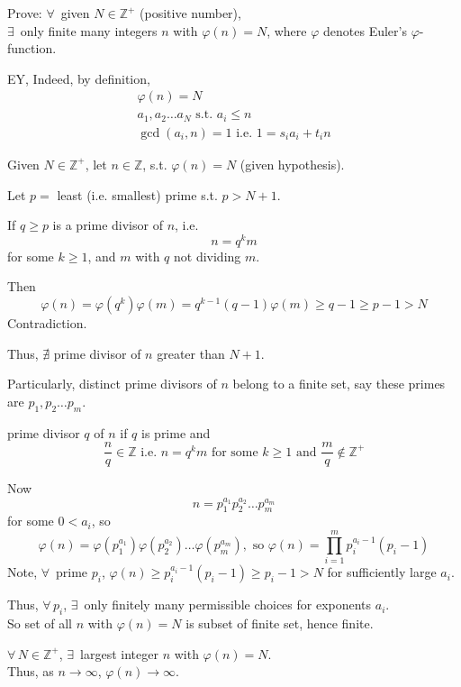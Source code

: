 Prove: $\forall \, $ given $N \in \mathbb{Z}^+$ (positive number), \\
$\exists \, $ only finite many integers $n$ with $\varphi(n) = N$, where $\varphi$ denotes Euler's $\varphi$-function.  

EY, Indeed, by definition, \\
\[
\begin{gathered}
\varphi(n) = N \\
a_1, a_2 \dots a_N \text{ s.t. } a_i \leq n \\
\gcd(a_i,n)=1 \text{ i.e. } 1 = s_i a_i + t_i n 
\end{gathered}
\]


Given $N \in \mathbb{Z}^+$, let $n \in \mathbb{Z}$, s.t. $\varphi(n) = N$ (given hypothesis).  

Let $p= $ least (i.e. smallest) prime s.t. $p > N+1$.  

If $q\geq p$ is a prime divisor of $n$, i.e. 
\[
n = q^k m 
\]
for some $k\geq 1$, and $m$ with $q$ not dividing $m$.  

Then 
\[
\varphi(n) = \varphi(q^k) \varphi(m) = q^{k-1}(q-1) \varphi(m) \geq q-1 \geq p -1 > N
\]
Contradiction.  

Thus, $\nexists$ prime divisor of $n$ greater than $N+1$.  

Particularly, distinct prime divisors of $n$ belong to a finite set, say these primes are $p_1,p_2 \dots p_m$.  

\begin{definition}
	prime divisor $q$ of $n$ if $q$ is prime and 
	\begin{equation}
	 \frac{n}{q} \in \mathbb{Z} \text{ i.e. } n =q^k m \text{ for some } k \geq 1 \text{ and } \frac{m}{q} \notin \mathbb{Z}^+
	\end{equation}
\end{definition}

Now
\[
n=p_1^{a_1}p_2^{a_2} \dots p_m^{a_m} 
\]
for some $0<a_i$, so 
\[
\varphi(n) = \varphi(p_1^{a_1}) \varphi(p_2^{a_2}) \dots \varphi( p_m^{a_m}), \text{ so } \varphi(n) = \prod_{i=1}^m p_i^{ a_i -1} (p_i-1)
\]
Note, $\forall \, $ prime $p_i$, $\varphi(n) \geq p_i^{a_i -1}(p_i-1) \geq p_i - 1 > N$ for sufficiently large $a_i$.  

Thus, $\forall \, p_i$, $\exists \, $ only finitely many permissible choices for exponents $a_i$.  \\
So set of all $n$ with $\varphi(n) = N$ is subset of finite set, hence finite.  

$\forall \, N \in \mathbb{Z}^+$, $\exists \, $ largest integer $n$ with $\varphi(n) = N$.  \\
Thus, as $n\to \infty$, $\varphi(n) \to \infty$.  










